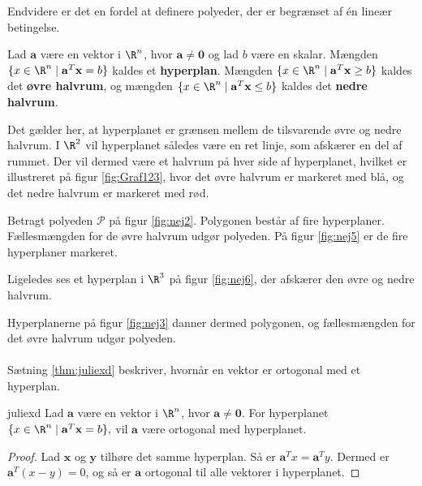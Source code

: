 Endvidere er det en fordel at definere polyeder, der er begrænset af én lineær betingelse. 
%
\begin{defn}{}{}
Lad $\mathbf{a}$ være en vektor i $\R^n$, hvor $\mathbf{a} \neq \mathbf{0}$ og lad $b$ være en skalar.
Mængden $\{x \in \R^n \mid \mathbf{a}^T \mathbf{x}=b\}$ kaldes et \textbf{hyperplan}.
%
Mængden $\{x \in \R^n \mid \mathbf{a}^T \mathbf{x} \geq b\}$ kaldes det \textbf{øvre halvrum}, og
mængden $\{x \in \R^n \mid \mathbf{a}^T \mathbf{x} \leq b\}$ kaldes det \textbf{nedre halvrum}.
\end{defn}
\noindent
%
Det gælder her, at hyperplanet er grænsen mellem de tilsvarende øvre og nedre halvrum.
I $\R^2$ vil hyperplanet således være en ret linje, som afskærer en del af rummet. 
Der vil dermed være et halvrum på hver side af hyperplanet, hvilket er illustreret på figur \ref{fig:Graf123}, hvor det øvre halvrum er markeret med blå, og det nedre halvrum er markeret med rød. 
%

%
Betragt polyeden $\mathcal{P}$ på figur \ref{fig:nej2}. 
Polygonen består af fire hyperplaner. 
Fællesmængden for de øvre halvrum udgør polyeden.
På figur \ref{fig:nej5} er de fire hyperplaner markeret. 
%
%

% 
%
%
Ligeledes ses et hyperplan i $\R^3$ på figur \ref{fig:nej6}, der afskærer den øvre og nedre halvrum.
%
%

%
%
Hyperplanerne på figur \ref{fig:nej3} danner dermed polygonen, og fællesmængden for det øvre halvrum udgør polyeden. 
\\\\
%
%
%
Sætning \ref{thm:juliexd} beskriver, hvornår en vektor er  ortogonal med et hyperplan. 
%
\begin{thm}{}{juliexd}
Lad $\mathbf{a}$ være en vektor i $\R^n$, hvor 
$\mathbf{a} \neq \mathbf{0}.$
For hyperplanet 
$\{x \in \R^n \mid \mathbf{a}^T \mathbf{x}=b\},$ 
vil $\mathbf{a}$ være ortogonal med hyperplanet.
\end{thm}
% 
\begin{proof}
Lad $\mathbf{x}$ og $\mathbf{y}$ tilhøre det samme hyperplan. 
Så er $\mathbf{a}^Tx=\mathbf{a}^Ty.$
Dermed er $\mathbf{a}^T(x-y)=0$, og så er $\mathbf{a}$ ortogonal til alle vektorer i hyperplanet. 
\end{proof}